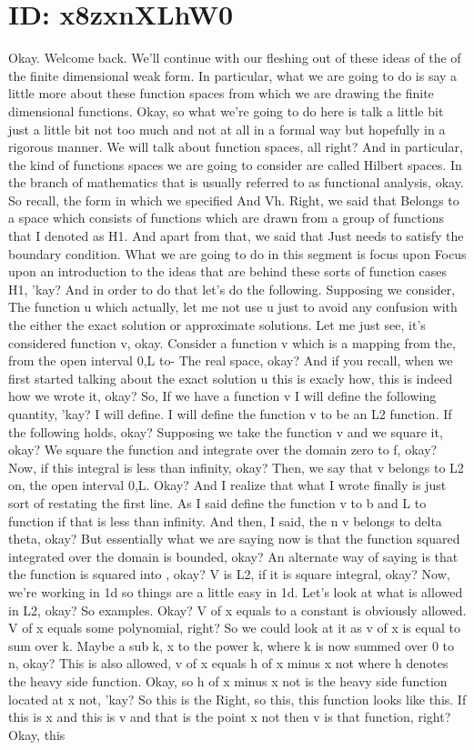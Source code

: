 \documentclass[10pt]{article}
\begin{document}
\section*{ID: x8zxnXLhW0}
Okay. Welcome back. We'll continue with our fleshing out of these ideas of the of the finite dimensional weak form. In particular, what we are going to do is say a little more about these function spaces from which we are drawing the finite dimensional functions. Okay, so what we're going to do here is talk a little bit just a little bit not too much and not at all in a formal way but hopefully in a rigorous manner. We will talk about function spaces, all right? And in particular, the kind of functions spaces we are going to consider are called Hilbert spaces. In the branch of mathematics that is usually referred to as functional analysis, okay. So recall, the form in which we specified And Vh. Right, we said that Belongs to a space which consists of functions which are drawn from a group of functions that I denoted as H1. And apart from that, we said that Just needs to satisfy the boundary condition. What we are going to do in this segment is focus upon Focus upon an introduction to the ideas that are behind these sorts of function cases H1, 'kay? And in order to do that let's do the following. Supposing we consider, The function u which actually, let me not use u just to avoid any confusion with the either the exact solution or approximate solutions. Let me just see, it's considered function v, okay. Consider a function v which is a mapping from the, from the open interval 0,L to- The real space, okay? And if you recall, when we first started talking about the exact solution u this is exacly how, this is indeed how we wrote it, okay? So, If we have a function v I will define the following quantity, 'kay? I will define. I will define the function v to be an L2 function. If the following holds, okay? Supposing we take the function v and we square it, okay? We square the function and integrate over the domain zero to f, okay? Now, if this integral is less than infinity, okay? Then, we say that v belongs to L2 on, the open interval 0,L. Okay? And I realize that what I wrote finally is just sort of restating the first line. As I said define the function v to b and L to function if that is less than infinity. And then, I said, the n v belongs to delta theta, okay? But essentially what we are saying now is that the function squared integrated over the domain is bounded, okay? An alternate way of saying is that the function is squared into , okay? V is L2, if it is square integral, okay? Now, we're working in 1d so things are a little easy in 1d. Let's look at what is allowed in L2, okay? So examples. Okay? V of x equals to a constant is obviously allowed. V of x equals some polynomial, right? So we could look at it as v of x is equal to sum over k. Maybe a sub k, x to the power k, where k is now summed over 0 to n, okay? This is also allowed, v of x equals h of x minus x not where h denotes the heavy side function. Okay, so h of x minus x not is the heavy side function located at x not, 'kay? So this is the Right, so this, this function looks like this. If this is x and this is v and that is the point x not then v is that function, right? Okay, this 
\end{document}
